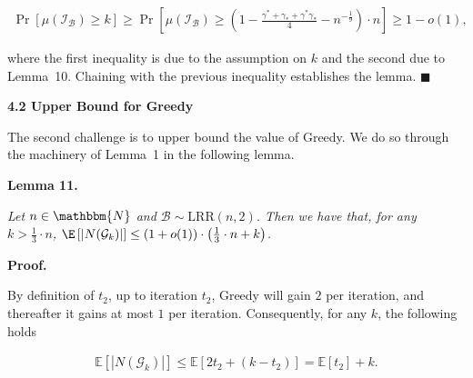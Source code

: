 \documentclass[10pt,a4paper]{article}
\begin{document}
\[\begin{gathered}
\displaystyle\Pr\left[\mu(\mathcal{I}_{\mathcal{B}})\geq k\right]\geq\Pr\left[\mu(\mathcal{I}_{\mathcal{B}})\geq\left(1-\frac{\gamma^{*}+\gamma_{*}+\gamma^{*}\gamma_{*}}{4}-n^{-\frac{1}{9}}\right)\cdot n\right]\geq 1-o(1),
\end{gathered}\]


where the first inequality is due to the assumption on $k$ and the second due to Lemma 10.
Chaining with the previous inequality establishes the lemma.
\ensuremath{\blacksquare}\par






\par\medskip\noindent\textbf{4.2 Upper Bound for Greedy}\par




The second challenge is to upper bound the value of Greedy. We do so through the machinery of Lemma 1 in the following lemma.\par





\par\medskip\noindent\textbf{\textbf{Lemma 11}\textbf{.}}\par



\emph{Let $n\in\mathbbm{N}$ and $\mathcal{B}\sim\text{{LRR}}\left(n,2\right)$.
Then we have that, for any $k>\frac{1}{3}\cdot n$, $\E\left[|N(\mathcal{G}_{k})|\right]\leq(1+o(1))\cdot\left(\frac{1}{3}\cdot n+k\right)$.}\par






\par\medskip\noindent\textbf{Proof.}\par



By definition of $t_{2}$, up to iteration $t_{2}$, Greedy will gain $2$ per iteration, and thereafter it gains at most $1$ per iteration. Consequently, for any $k$, the following holds\par


\[\begin{gathered}
\mathbb{E}\left[|N(\mathcal{G}_{k})|\right]\leq\mathbb{E}\left[2t_{2}+(k-t_{2})\right]=\mathbb{E}[t_{2}]+k.
\end{gathered}\]
\end{document}

